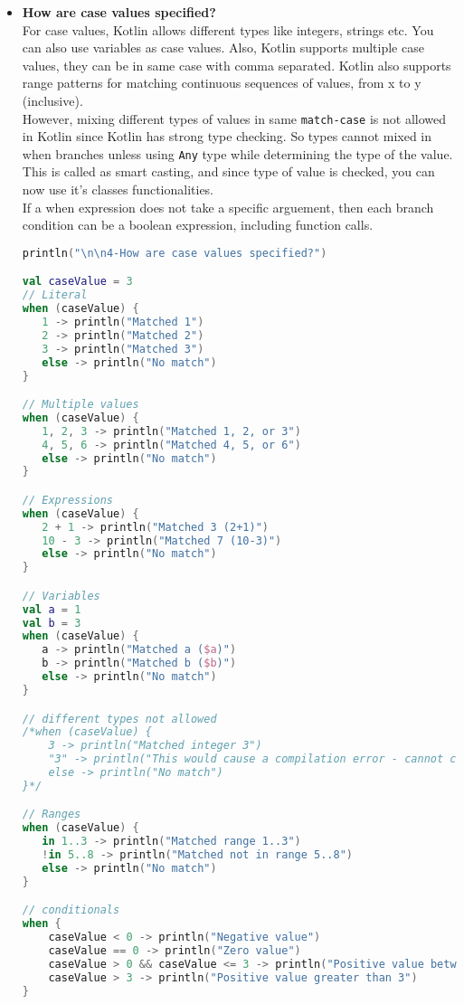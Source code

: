 \documentclass{article}
\begin{document}
\begin{itemize}
\item \textbf{How are case values specified?} \\
For case values, Kotlin allows different types like integers, strings etc. You can also use variables as case values. Also, Kotlin supports multiple case values, they can be in same case with comma separated. Kotlin also supports range patterns for matching continuous sequences of values, from x to y (inclusive). \\
However, mixing different types of values in same \texttt{match-case} is not allowed in Kotlin since Kotlin has strong type checking. So types cannot mixed in when branches unless using \texttt{Any} type while determining the type of the value. This is called as smart casting, and since type of value is checked, you can now use it's classes functionalities.\\
If a when expression does not take a specific arguement, then each branch condition can be a boolean expression, including function calls.
\begin{lstlisting}[language=Kotlin]
println("\n\n4-How are case values specified?")

val caseValue = 3
// Literal
when (caseValue) {
   1 -> println("Matched 1")
   2 -> println("Matched 2")
   3 -> println("Matched 3")
   else -> println("No match")
}

// Multiple values
when (caseValue) {
   1, 2, 3 -> println("Matched 1, 2, or 3")
   4, 5, 6 -> println("Matched 4, 5, or 6")
   else -> println("No match")
}

// Expressions
when (caseValue) {
   2 + 1 -> println("Matched 3 (2+1)")
   10 - 3 -> println("Matched 7 (10-3)")
   else -> println("No match")
}

// Variables
val a = 1
val b = 3
when (caseValue) {
   a -> println("Matched a ($a)")
   b -> println("Matched b ($b)")
   else -> println("No match")
}

// different types not allowed
/*when (caseValue) {
    3 -> println("Matched integer 3")
    "3" -> println("This would cause a compilation error - cannot compare Int with String")
    else -> println("No match")
}*/  

// Ranges
when (caseValue) {
   in 1..3 -> println("Matched range 1..3")
   !in 5..8 -> println("Matched not in range 5..8")
   else -> println("No match")
}

// conditionals
when {
    caseValue < 0 -> println("Negative value")
    caseValue == 0 -> println("Zero value")
    caseValue > 0 && caseValue <= 3 -> println("Positive value between 1 and 3")
    caseValue > 3 -> println("Positive value greater than 3")
}


\end{lstlisting}
\end{itemize}
\end{document}
